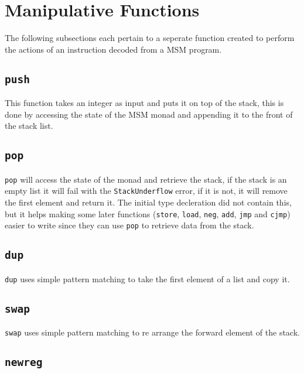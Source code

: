 \section{Manipulative Functions}
The following subsections each pertain to a seperate function created to perform
the actions of an instruction decoded from a MSM program.

\subsection{\texttt{push}}

This function takes an integer as input and puts it on top of the stack, this is
done by accessing the state of the MSM monad and appending it to the front of
the stack list.

\subsection{\texttt{pop}}

\texttt{pop} will access the state of the monad and retrieve the stack, if the
stack is an empty list it will fail with the \texttt{StackUnderflow} error, if
it is not, it will remove the first element and return it. The initial type
decleration did not contain this, but it helps making some later functions
(\texttt{store}, \texttt{load}, \texttt{neg}, \texttt{add}, \texttt{jmp} and
\texttt{cjmp}) easier to write since they can use \texttt{pop} to retrieve data
from the stack.

\subsection{\texttt{dup}}

\texttt{dup} uses simple pattern matching to take the first element of a list
and copy it.

\subsection{\texttt{swap}}
 \texttt{swap}
uses simple pattern matching to re arrange the forward element of the stack.

\subsection{\texttt{newreg}}

